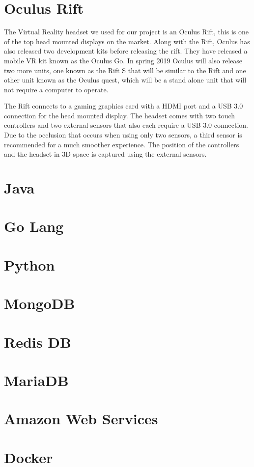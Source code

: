 \section {Oculus Rift}
The Virtual Reality headset we used for our project is an Oculus Rift, this is one of the top head mounted displays on the market. Along with the Rift, Oculus has also released two development kits before releasing the rift. They have released a mobile VR kit known as the Oculus Go. In spring 2019 Oculus will also release two more units, one known as the Rift S that will be similar to the Rift and one other unit known as the Oculus quest, which will be a stand alone unit that will not require a computer to operate. \newline

The Rift connects to a gaming graphics card with a HDMI port and a USB 3.0 connection for the head mounted display. The headset comes with two touch controllers and two external sensors that also each require a USB 3.0 connection. Due to the occlusion that occurs when using only two sensors, a third sensor is recommended for a much smoother experience. The position of the controllers and the headset in 3D space is captured using the external sensors.

\section {Java}
\section {Go Lang}
\section {Python}
\section {MongoDB}
\section {Redis DB}
\section {MariaDB}
\section {Amazon Web Services}
\section {Docker}